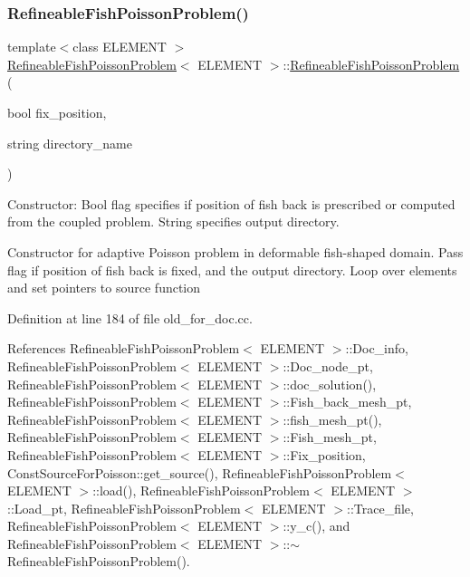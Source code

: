 \subsubsection{\texorpdfstring{Refineable\+Fish\+Poisson\+Problem()}{RefineableFishPoissonProblem()}\hspace{0.1cm}{\footnotesize\ttfamily [2/2]}}
{\footnotesize\ttfamily template$<$class E\+L\+E\+M\+E\+NT $>$ \\
\hyperlink{classRefineableFishPoissonProblem}{Refineable\+Fish\+Poisson\+Problem}$<$ E\+L\+E\+M\+E\+NT $>$\+::\hyperlink{classRefineableFishPoissonProblem}{Refineable\+Fish\+Poisson\+Problem} (\begin{DoxyParamCaption}\item[{bool}]{fix\+\_\+position,  }\item[{string}]{directory\+\_\+name }\end{DoxyParamCaption})}



Constructor\+: Bool flag specifies if position of fish back is prescribed or computed from the coupled problem. String specifies output directory. 

Constructor for adaptive Poisson problem in deformable fish-\/shaped domain. Pass flag if position of fish back is fixed, and the output directory. Loop over elements and set pointers to source function 

Definition at line 184 of file old\+\_\+for\+\_\+doc.\+cc.



References Refineable\+Fish\+Poisson\+Problem$<$ E\+L\+E\+M\+E\+N\+T $>$\+::\+Doc\+\_\+info, Refineable\+Fish\+Poisson\+Problem$<$ E\+L\+E\+M\+E\+N\+T $>$\+::\+Doc\+\_\+node\+\_\+pt, Refineable\+Fish\+Poisson\+Problem$<$ E\+L\+E\+M\+E\+N\+T $>$\+::doc\+\_\+solution(), Refineable\+Fish\+Poisson\+Problem$<$ E\+L\+E\+M\+E\+N\+T $>$\+::\+Fish\+\_\+back\+\_\+mesh\+\_\+pt, Refineable\+Fish\+Poisson\+Problem$<$ E\+L\+E\+M\+E\+N\+T $>$\+::fish\+\_\+mesh\+\_\+pt(), Refineable\+Fish\+Poisson\+Problem$<$ E\+L\+E\+M\+E\+N\+T $>$\+::\+Fish\+\_\+mesh\+\_\+pt, Refineable\+Fish\+Poisson\+Problem$<$ E\+L\+E\+M\+E\+N\+T $>$\+::\+Fix\+\_\+position, Const\+Source\+For\+Poisson\+::get\+\_\+source(), Refineable\+Fish\+Poisson\+Problem$<$ E\+L\+E\+M\+E\+N\+T $>$\+::load(), Refineable\+Fish\+Poisson\+Problem$<$ E\+L\+E\+M\+E\+N\+T $>$\+::\+Load\+\_\+pt, Refineable\+Fish\+Poisson\+Problem$<$ E\+L\+E\+M\+E\+N\+T $>$\+::\+Trace\+\_\+file, Refineable\+Fish\+Poisson\+Problem$<$ E\+L\+E\+M\+E\+N\+T $>$\+::y\+\_\+c(), and Refineable\+Fish\+Poisson\+Problem$<$ E\+L\+E\+M\+E\+N\+T $>$\+::$\sim$\+Refineable\+Fish\+Poisson\+Problem().

